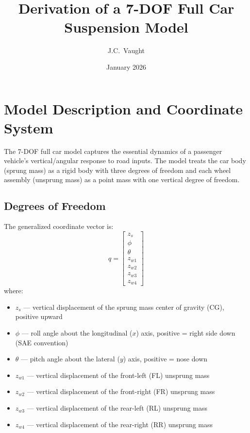 \documentclass[11pt]{article}
\title{Derivation of a 7-DOF Full Car Suspension Model}
\author{J.C.\ Vaught}
\date{January 2026}
\def\vect#1{#1}%
\newcommand{\vect}[1]{\bm{#1}}
\begin{document}
\maketitle
\tableofcontents
\newpage

\section{Model Description and Coordinate System}

The 7-DOF full car model captures the essential dynamics of a passenger vehicle's vertical/angular response to road inputs. The model treats the car body (sprung mass) as a rigid body with three degrees of freedom and each wheel assembly (unsprung mass) as a point mass with one vertical degree of freedom.

\subsection{Degrees of Freedom}

The generalized coordinate vector is:
\begin{equation}
\vect{q} = \begin{bmatrix} z_s \\ \phi \\ \theta \\ z_{w1} \\ z_{w2} \\ z_{w3} \\ z_{w4} \end{bmatrix}
\end{equation}
where:
\begin{itemize}[nosep]
  \item $z_s$ --- vertical displacement of the sprung mass center of gravity (CG), positive upward
  \item $\phi$ --- roll angle about the longitudinal ($x$) axis, positive = right side down (SAE convention)
  \item $\theta$ --- pitch angle about the lateral ($y$) axis, positive = nose down
  \item $z_{w1}$ --- vertical displacement of the front-left (FL) unsprung mass
  \item $z_{w2}$ --- vertical displacement of the front-right (FR) unsprung mass
  \item $z_{w3}$ --- vertical displacement of the rear-left (RL) unsprung mass
  \item $z_{w4}$ --- vertical displacement of the rear-right (RR) unsprung mass
\end{itemize}
\end{document}
